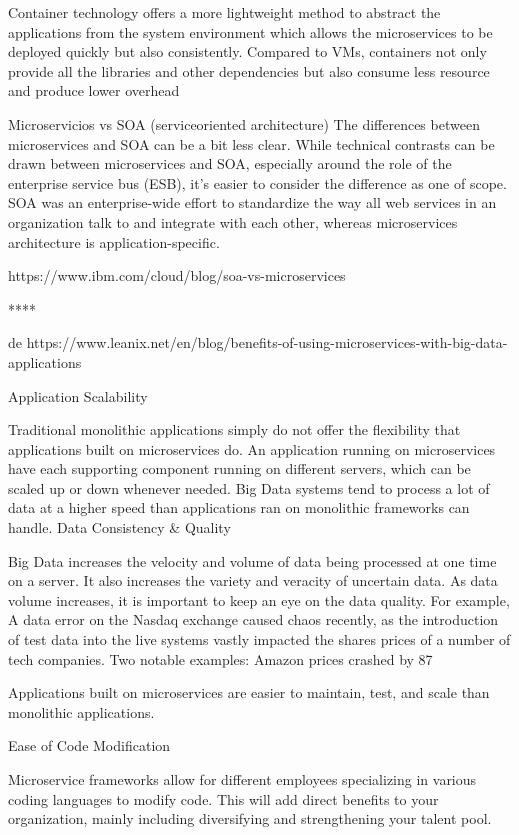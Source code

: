 Container technology offers a more lightweight method to
abstract the applications from the system environment which
allows the microservices to be deployed quickly but also
consistently. Compared to VMs, containers not only provide
all the libraries and other dependencies but also consume less
resource and produce lower overhead







Microservicios vs SOA (serviceoriented architecture)
The differences between microservices and SOA can be a bit less clear. While technical contrasts can be drawn between microservices and SOA, especially around the role of the enterprise service bus (ESB), it’s easier to consider the difference as one of scope. SOA was an enterprise-wide effort to standardize the way all web services in an organization talk to and integrate with each other, whereas microservices architecture is application-specific.

https://www.ibm.com/cloud/blog/soa-vs-microservices


****

de https://www.leanix.net/en/blog/benefits-of-using-microservices-with-big-data-applications

Application Scalability

Traditional monolithic applications simply do not offer the flexibility that applications built on microservices do. An application running on microservices have each supporting component running on different servers, which can be scaled up or down whenever needed. Big Data systems tend to process a lot of data at a higher speed than applications ran on monolithic frameworks can handle.
Data Consistency & Quality

Big Data increases the velocity and volume of data being processed at one time on a server. It also increases the variety and veracity of uncertain data. As data volume increases, it is important to keep an eye on the data quality. For example, A data error on the Nasdaq exchange caused chaos recently, as the introduction of test data into the live systems vastly impacted the shares prices of a number of tech companies. Two notable examples: Amazon prices crashed by 87%

Applications built on microservices are easier to maintain, test, and scale than monolithic applications.

Ease of Code Modification

Microservice frameworks allow for different employees specializing in various coding languages to modify code. This will add direct benefits to your organization, mainly including diversifying and strengthening your talent pool.


